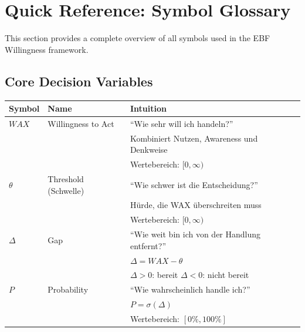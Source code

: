 

\section{Quick Reference: Symbol Glossary}
\label{sec:glossary}

This section provides a complete overview of all symbols used in the EBF Willingness framework.

\subsection{Core Decision Variables}

\begin{longtable}{p{2cm}p{4cm}p{7cm}}
\toprule
\textbf{Symbol} & \textbf{Name} & \textbf{Intuition} \\
\midrule
\endhead

$WAX$ & Willingness to Act & 
``Wie sehr will ich handeln?'' \\
& & Kombiniert Nutzen, Awareness und Denkweise \\
& & Wertebereich: $[0, \infty)$ \\[6pt]

$\theta$ & Threshold (Schwelle) & 
``Wie schwer ist die Entscheidung?'' \\
& & Hürde, die WAX überschreiten muss \\
& & Wertebereich: $[0, \infty)$ \\[6pt]

$\Delta$ & Gap & 
``Wie weit bin ich von der Handlung entfernt?'' \\
& & $\Delta = WAX - \theta$ \\
& & $\Delta > 0$: bereit \quad $\Delta < 0$: nicht bereit \\[6pt]

$P$ & Probability & 
``Wie wahrscheinlich handle ich?'' \\
& & $P = \sigma(\Delta)$ \\
& & Wertebereich: $[0\%, 100\%]$ \\[6pt]

\bottomrule
\end{longtable}

